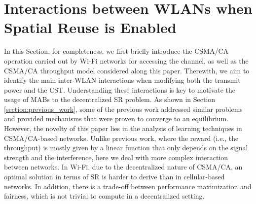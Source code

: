 \documentclass{article}
\begin{document}
\section{Interactions between WLANs when Spatial Reuse is Enabled}
\label{section:interactions_wlans}    
In this Section, for completeness, we first briefly introduce the CSMA/CA operation carried out by Wi-Fi networks for accessing the channel, as well as the CSMA/CA throughput model considered along this paper. Therewith, we aim to identify the main inter-WLAN interactions when modifying both the transmit power and the CST. Understanding these interactions is key to motivate the usage of MABs to the decentralized SR problem. As shown in Section \ref{section:previous_work}, some of the previous work addressed similar problems and provided mechanisms that were proven to converge to an equilibrium. However, the novelty of this paper lies in the analysis of learning techniques in CSMA/CA-based networks. Unlike previous work, where the reward (i.e., the throughput) is mostly given by a linear function that only depends on the signal strength and the interference, here we deal with more complex interaction between networks. In Wi-Fi, due to the decentralized nature of CSMA/CA, an optimal solution in terms of SR is harder to derive than in cellular-based networks. In addition, there is a trade-off between performance maximization and fairness, which is not trivial to compute in a decentralized setting.
	
\end{document}
